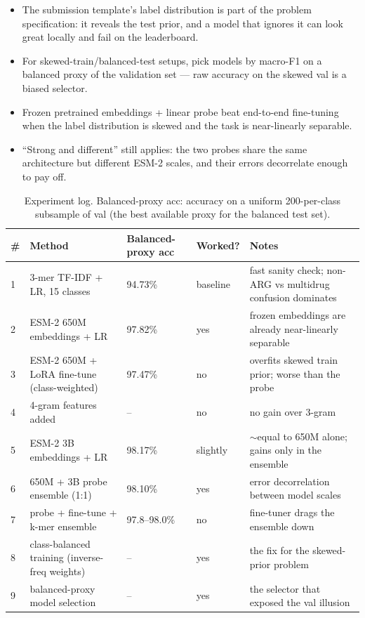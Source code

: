 \documentclass[11pt,a4paper]{article}
\begin{document}
\begin{itemize}
\item The submission template's label distribution is part of the
problem specification: it reveals the test prior, and a model that
ignores it can look great locally and fail on the leaderboard.
\item For skewed-train/balanced-test setups, pick models by macro-F1 on
a balanced proxy of the validation set --- raw accuracy on the skewed
val is a biased selector.
\item Frozen pretrained embeddings + linear probe beat end-to-end
fine-tuning when the label distribution is skewed and the task is
near-linearly separable.
\item ``Strong and different'' still applies: the two probes share the
same architecture but different ESM-2 scales, and their errors
decorrelate enough to pay off.
\end{itemize}

\begin{table}[h]
\centering
\small
\begin{tabular}{p{0.45cm} p{6.2cm} p{1.9cm} p{1.9cm} p{4.6cm}}
\toprule
\# & Method & Balanced-proxy acc & Worked? & Notes \\
\midrule
1 & 3-mer TF-IDF + LR, 15 classes & 94.73\% & baseline & fast sanity
check; non-ARG vs multidrug confusion dominates \\
2 & ESM-2 650M embeddings + LR & 97.82\% & yes & frozen embeddings are
already near-linearly separable \\
3 & ESM-2 650M + LoRA fine-tune (class-weighted) & 97.47\% & no &
overfits skewed train prior; worse than the probe \\
4 & 4-gram features added & -- & no & no gain over 3-gram \\
5 & ESM-2 3B embeddings + LR & 98.17\% & slightly & $\sim$equal to
650M alone; gains only in the ensemble \\
6 & 650M + 3B probe ensemble (1:1) & 98.10\% & yes & error
decorrelation between model scales \\
7 & probe + fine-tune + k-mer ensemble & 97.8--98.0\% & no &
fine-tuner drags the ensemble down \\
8 & class-balanced training (inverse-freq weights) & -- & yes & the fix
for the skewed-prior problem \\
9 & balanced-proxy model selection & -- & yes & the selector that
exposed the val illusion \\
\bottomrule
\end{tabular}
\caption{Experiment log. Balanced-proxy acc: accuracy on a uniform
200-per-class subsample of val (the best available proxy for the
balanced test set).}
\end{table}
\end{document}
